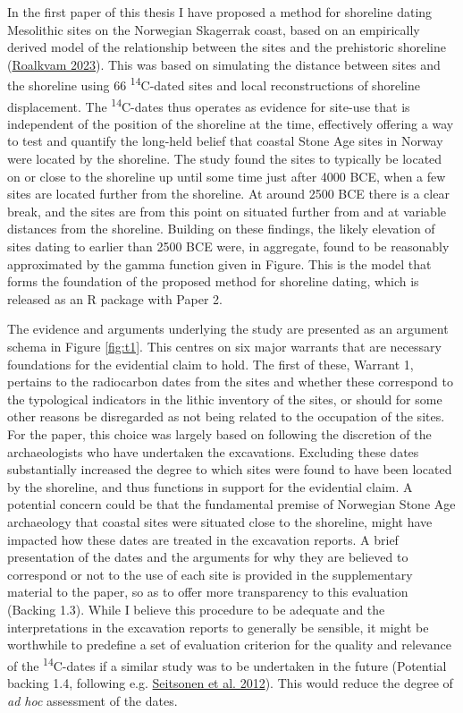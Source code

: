 \documentclass[
  a4paper,
  oneside]{uiophdthesis}
\begin{document}
In the first paper of this thesis I have proposed a method for shoreline dating Mesolithic sites on the Norwegian Skagerrak coast, based on an empirically derived model of the relationship between the sites and the prehistoric shoreline (\protect\hyperlink{ref-roalkvam2023}{Roalkvam 2023}). This was based on simulating the distance between sites and the shoreline using 66 \textsuperscript{14}C-dated sites and local reconstructions of shoreline displacement. The \textsuperscript{14}C-dates thus operates as evidence for site-use that is independent of the position of the shoreline at the time, effectively offering a way to test and quantify the long-held belief that coastal Stone Age sites in Norway were located by the shoreline. The study found the sites to typically be located on or close to the shoreline up until some time just after 4000 BCE, when a few sites are located further from the shoreline. At around 2500 BCE there is a clear break, and the sites are from this point on situated further from and at variable distances from the shoreline. Building on these findings, the likely elevation of sites dating to earlier than 2500 BCE were, in aggregate, found to be reasonably approximated by the gamma function given in Figure. This is the model that forms the foundation of the proposed method for shoreline dating, which is released as an R package with Paper 2.

The evidence and arguments underlying the study are presented as an argument schema in Figure \ref{fig:t1}. This centres on six major warrants that are necessary foundations for the evidential claim to hold. The first of these, Warrant 1, pertains to the radiocarbon dates from the sites and whether these correspond to the typological indicators in the lithic inventory of the sites, or should for some other reasons be disregarded as not being related to the occupation of the sites. For the paper, this choice was largely based on following the discretion of the archaeologists who have undertaken the excavations. Excluding these dates substantially increased the degree to which sites were found to have been located by the shoreline, and thus functions in support for the evidential claim. A potential concern could be that the fundamental premise of Norwegian Stone Age archaeology that coastal sites were situated close to the shoreline, might have impacted how these dates are treated in the excavation reports. A brief presentation of the dates and the arguments for why they are believed to correspond or not to the use of each site is provided in the supplementary material to the paper, so as to offer more transparency to this evaluation (Backing 1.3). While I believe this procedure to be adequate and the interpretations in the excavation reports to generally be sensible, it might be worthwhile to predefine a set of evaluation criterion for the quality and relevance of the \textsuperscript{14}C-dates if a similar study was to be undertaken in the future (Potential backing 1.4, following e.g. \protect\hyperlink{ref-seitsonen2012}{Seitsonen et al. 2012}). This would reduce the degree of \emph{ad hoc} assessment of the dates.
\end{document}

